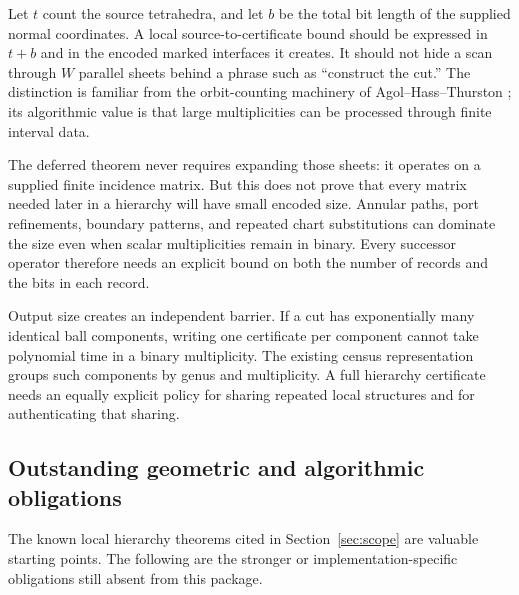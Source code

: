 Let $t$ count the source tetrahedra, and let $b$ be the total bit length
of the supplied normal coordinates.  A local source-to-certificate bound
should be expressed in $t+b$ and in the encoded marked interfaces it
creates.  It should not hide a scan through $W$ parallel sheets behind a
phrase such as ``construct the cut.''  The distinction is familiar from
the orbit-counting machinery of Agol--Hass--Thurston
\cite{AgolHassThurston}; its algorithmic value is that large multiplicities
can be processed through finite interval data.

The deferred theorem never requires expanding those sheets: it operates
on a supplied finite incidence matrix.  But this does not prove that
every matrix needed later in a hierarchy will have small encoded size.
Annular paths, port refinements, boundary patterns, and repeated chart
substitutions can dominate the size even when scalar multiplicities
remain in binary.  Every successor operator therefore needs an explicit
bound on both the number of records and the bits in each record.

Output size creates an independent barrier.  If a cut has exponentially
many identical ball components, writing one certificate per component
cannot take polynomial time in a binary multiplicity.  The existing
census representation groups such components by genus and multiplicity.
A full hierarchy certificate needs an equally explicit policy for
sharing repeated local structures and for authenticating that sharing.

\subsection{Outstanding geometric and algorithmic obligations}

The known local hierarchy theorems cited in Section~\ref{sec:scope} are
valuable starting points.  The following are the stronger or
implementation-specific obligations still absent from this package.

